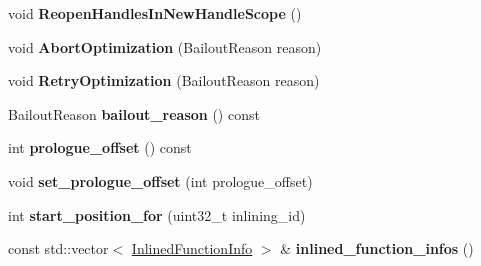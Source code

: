 \begin{DoxyCompactItemize}
\item 
void {\bfseries Reopen\+Handles\+In\+New\+Handle\+Scope} ()\hypertarget{classv8_1_1internal_1_1_compilation_info_af8499ea510963fd62ff92cb5d3b56969}{}\label{classv8_1_1internal_1_1_compilation_info_af8499ea510963fd62ff92cb5d3b56969}

\item 
void {\bfseries Abort\+Optimization} (Bailout\+Reason reason)\hypertarget{classv8_1_1internal_1_1_compilation_info_a149c565584f7acb6ad7742a2219f3d0a}{}\label{classv8_1_1internal_1_1_compilation_info_a149c565584f7acb6ad7742a2219f3d0a}

\item 
void {\bfseries Retry\+Optimization} (Bailout\+Reason reason)\hypertarget{classv8_1_1internal_1_1_compilation_info_a2faca202b896af987022cd3a393a3e95}{}\label{classv8_1_1internal_1_1_compilation_info_a2faca202b896af987022cd3a393a3e95}

\item 
Bailout\+Reason {\bfseries bailout\+\_\+reason} () const \hypertarget{classv8_1_1internal_1_1_compilation_info_ac77f6aea1c883a9653919a977d8474f1}{}\label{classv8_1_1internal_1_1_compilation_info_ac77f6aea1c883a9653919a977d8474f1}

\item 
int {\bfseries prologue\+\_\+offset} () const \hypertarget{classv8_1_1internal_1_1_compilation_info_a9e43975d9d2b1f354d4fc0960686812c}{}\label{classv8_1_1internal_1_1_compilation_info_a9e43975d9d2b1f354d4fc0960686812c}

\item 
void {\bfseries set\+\_\+prologue\+\_\+offset} (int prologue\+\_\+offset)\hypertarget{classv8_1_1internal_1_1_compilation_info_a4f79f6d655aaac63f51751efa7ef6e5a}{}\label{classv8_1_1internal_1_1_compilation_info_a4f79f6d655aaac63f51751efa7ef6e5a}

\item 
int {\bfseries start\+\_\+position\+\_\+for} (uint32\+\_\+t inlining\+\_\+id)\hypertarget{classv8_1_1internal_1_1_compilation_info_a71111effe549eec98ccccda4213d1a0a}{}\label{classv8_1_1internal_1_1_compilation_info_a71111effe549eec98ccccda4213d1a0a}

\item 
const std\+::vector$<$ \hyperlink{structv8_1_1internal_1_1_inlined_function_info}{Inlined\+Function\+Info} $>$ \& {\bfseries inlined\+\_\+function\+\_\+infos} ()\hypertarget{classv8_1_1internal_1_1_compilation_info_a682a7f58f9cd40df31ec997e78f151da}{}\label{classv8_1_1internal_1_1_compilation_info_a682a7f58f9cd40df31ec997e78f151da}


\end{DoxyCompactItemize}
